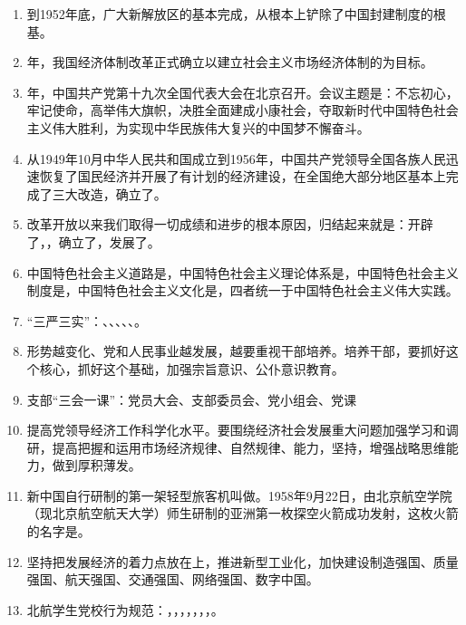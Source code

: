 \documentclass[UTF8,11pt,a4paper]{ctexart}
\begin{document}
\begin{enumerate}[label=\textbf{\arabic*.}, leftmargin=2.5em, itemsep=0.5em]
\item 到1952年底，广大新解放区的基本完成，从根本上铲除了中国封建制度的根基。
\item {}年，我国经济体制改革正式确立以建立社会主义市场经济体制的为目标。
\item {}年，中国共产党第十九次全国代表大会在北京召开。会议主题是：不忘初心，牢记使命，高举伟大旗帜，决胜全面建成小康社会，夺取新时代中国特色社会主义伟大胜利，为实现中华民族伟大复兴的中国梦不懈奋斗。
\item 从1949年10月中华人民共和国成立到1956年，中国共产党领导全国各族人民迅速恢复了国民经济并开展了有计划的经济建设，在全国绝大部分地区基本上完成了三大改造，确立了。
\item 改革开放以来我们取得一切成绩和进步的根本原因，归结起来就是：开辟了，，确立了，发展了。
\item 中国特色社会主义道路是，中国特色社会主义理论体系是，中国特色社会主义制度是，中国特色社会主义文化是，四者统一于中国特色社会主义伟大实践。
\item “三严三实”：、、、、、。
\item 形势越变化、党和人民事业越发展，越要重视干部培养。培养干部，要抓好这个核心，抓好这个基础，加强宗旨意识、公仆意识教育。
\item 支部“三会一课”：党员大会、支部委员会、党小组会、党课
\item 提高党领导经济工作科学化水平。要围绕经济社会发展重大问题加强学习和调研，提高把握和运用市场经济规律、自然规律、能力，坚持，增强战略思维能力，做到厚积薄发。
\item 新中国自行研制的第一架轻型旅客机叫做。1958年9月22日，由北京航空学院（现北京航空航天大学）师生研制的亚洲第一枚探空火箭成功发射，这枚火箭的名字是。
\item 坚持把发展经济的着力点放在上，推进新型工业化，加快建设制造强国、质量强国、航天强国、交通强国、网络强国、数字中国。
\item 北航学生党校行为规范：，，，，，，，。

\end{enumerate}
\end{document}
